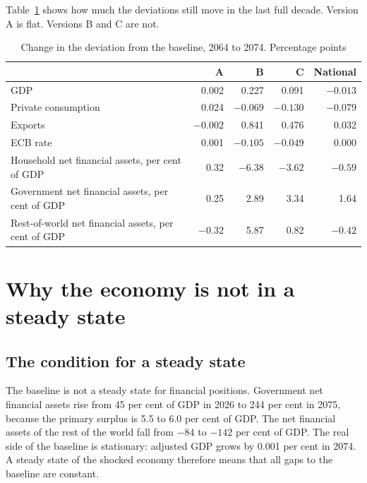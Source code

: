 \documentclass[11pt,a4paper]{article}
\begin{document}
Table~\ref{tab:flat} shows how much the deviations still move in the last full decade.
Version A is flat. Versions B and C are not.

\begin{table}[ht]
\centering
\small
\caption{Change in the deviation from the baseline, 2064 to 2074. Percentage points}
\label{tab:flat}
\begin{tabular}{@{}lrrrr@{}}
\toprule
 & A & B & C & National \\
\midrule
GDP & 0.002 & 0.227 & 0.091 & $-0.013$ \\
Private consumption & 0.024 & $-0.069$ & $-0.130$ & $-0.079$ \\
Exports & $-0.002$ & 0.841 & 0.476 & 0.032 \\
ECB rate & 0.001 & $-0.105$ & $-0.049$ & 0.000 \\
Household net financial assets, per cent of GDP & 0.32 & $-6.38$ & $-3.62$ & $-0.59$ \\
Government net financial assets, per cent of GDP & 0.25 & 2.89 & 3.34 & 1.64 \\
Rest-of-world net financial assets, per cent of GDP & $-0.32$ & 5.87 & 0.82 & $-0.42$ \\
\bottomrule
\end{tabular}
\end{table}

\section{Why the economy is not in a steady state}

\subsection{The condition for a steady state}

The baseline is not a steady state for financial positions.
Government net financial assets rise from 45 per cent of GDP in 2026 to 244 per cent in 2075, because the primary surplus is 5.5 to 6.0 per cent of GDP.
The net financial assets of the rest of the world fall from $-84$ to $-142$ per cent of GDP.
The real side of the baseline is stationary: adjusted GDP grows by 0.001 per cent in 2074.
A steady state of the shocked economy therefore means that all gaps to the baseline are constant.
\end{document}
